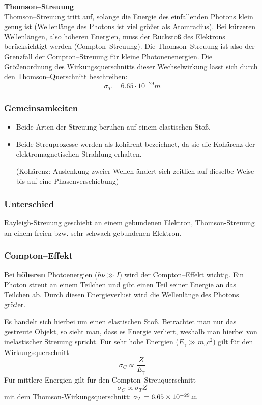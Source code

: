 \documentclass[Ex4_Zusammenfassung.tex]{subfiles}
\begin{document}
\textbf{Thomson--Streuung} \\

Thomson--Streuung tritt auf, solange die Energie des einfallenden Photons klein genug ist (Wellenlänge des Photons ist viel größer als Atomradius). Bei kürzeren Wellenlängen, also höheren Energien, muss der Rückstoß des Elektrons berücksichtigt werden (Compton--Streuung). Die Thomson--Streuung ist also der Grenzfall der Compton--Streuung für kleine Photonenenergien.  Die Größenordnung des Wirkungsquerschnitts dieser Wechselwirkung lässt sich durch den Thomson--Querschnitt beschreiben:
\begin{equation}
\sigma_{T} = 6.65 \cdot 10^{-29}  m 
\end{equation}

\subsubsection{Gemeinsamkeiten}
\begin{itemize}
\item Beide Arten der Streuung beruhen auf einem elastischen Stoß.
\item Beide Streuprozesse werden als kohärent bezeichnet, da sie die Kohärenz der elektromagnetischen Strahlung erhalten. 

(Kohärenz: Auslenkung zweier Wellen ändert sich zeitlich auf dieselbe Weise bis auf eine Phasenverschiebung)
\end{itemize}

\subsubsection{Unterschied} 
Rayleigh-Streuung geschieht an einem gebundenen Elektron, Thomson-Streuung an einem freien bzw. sehr schwach gebundenen Elektron.

\subsubsection{Compton--Effekt}
Bei \textbf{höheren} Photoenergien ($ h \nu \gg I$) wird der Compton--Effekt wichtig. Ein Photon streut an einem Teilchen und gibt einen Teil seiner Energie an das Teilchen ab. Durch diesen Energieverlust wird die Wellenlänge des Photons größer.

Es handelt sich hierbei um einen elastischen Stoß. Betrachtet man nur das gestreute Objekt, so sieht man, dass es Energie verliert, weshalb man hierbei von inelastischer Streuung spricht. Für sehr hohe Energien ($E_{\gamma} \gg m_e c^2$) gilt für den Wirkungsquerschnitt
\begin{equation}
	\sigma_{C} \propto \frac{Z}{E_{\gamma}}
\end{equation}
Für mittlere Energien gilt für den Compton--Streuquerschnitt
\begin{equation}
	\sigma_{C} \propto \sigma_{T} Z 
\end{equation}
mit dem Thomson-Wirkungsquerschnitt: $\sigma_{T} = \SI{6.65E-29}{m}$ 
\end{document}
